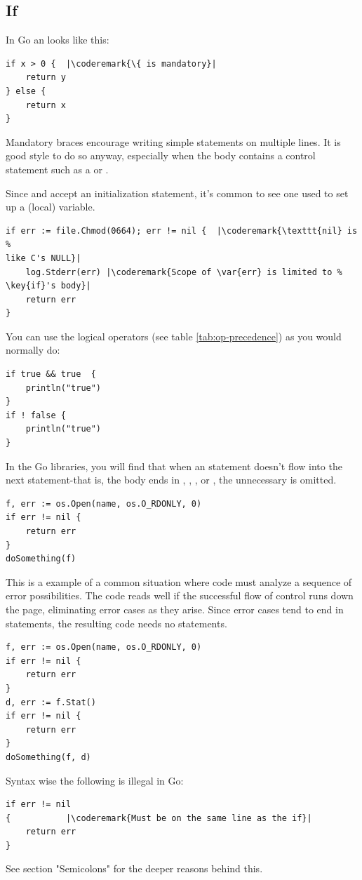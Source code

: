 \subsection{If}
In Go an  looks like this:
\begin{lstlisting}
if x > 0 {	|\coderemark{\{ is mandatory}|
    return y
} else {
    return x
}
\end{lstlisting}
Mandatory braces encourage writing simple  statements on multiple
lines. It is good style to do so anyway, especially when the body
contains a control statement such as a
 or
.

Since  and  accept an initialization statement, it's common to
see one used to set up a (local) variable.
\begin{lstlisting}
if err := file.Chmod(0664); err != nil {  |\coderemark{\texttt{nil} is %
like C's NULL}|
    log.Stderr(err) |\coderemark{Scope of \var{err} is limited to %
\key{if}'s body}|
    return err
}
\end{lstlisting}

You can use the logical operators (see table \ref{tab:op-precedence}) as
you would normally do:
\begin{lstlisting}
if true && true  {
    println("true")
}
if ! false {
    println("true")
}
\end{lstlisting}

In the Go libraries, you will find that when an  statement doesn't flow
into the next statement-that is, the body ends in ,
, ,
or , the unnecessary  is omitted.

\begin{lstlisting}
f, err := os.Open(name, os.O_RDONLY, 0)
if err != nil {
    return err
}
doSomething(f)
\end{lstlisting}
This is a example of a common situation where code must analyze a
sequence of error possibilities. The code reads well if the successful
flow of control runs down the page, eliminating error cases as they
arise. Since error cases tend to end in  statements, the resulting
code needs no  statements.
\begin{lstlisting}
f, err := os.Open(name, os.O_RDONLY, 0)
if err != nil {
    return err
}
d, err := f.Stat()
if err != nil {
    return err
}
doSomething(f, d)
\end{lstlisting}
Syntax wise the following is illegal in Go:
\begin{lstlisting}
if err != nil
{		    |\coderemark{Must be on the same line as the if}|
    return err
}
\end{lstlisting}
See \cite{effective_go} section "Semicolons" for the deeper reasons
behind this.

